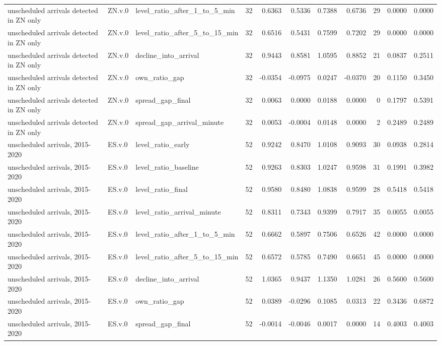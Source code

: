 \begin{tabular}{lllrrrrrrrr}
unscheduled arrivals detected in ZN only & ZN.v.0 & level_ratio_after_1_to_5_min & 32 & 0.6363 & 0.5336 & 0.7388 & 0.6736 & 29 & 0.0000 & 0.0000 \\
unscheduled arrivals detected in ZN only & ZN.v.0 & level_ratio_after_5_to_15_min & 32 & 0.6516 & 0.5431 & 0.7599 & 0.7202 & 29 & 0.0000 & 0.0000 \\
unscheduled arrivals detected in ZN only & ZN.v.0 & decline_into_arrival & 32 & 0.9443 & 0.8581 & 1.0595 & 0.8852 & 21 & 0.0837 & 0.2511 \\
unscheduled arrivals detected in ZN only & ZN.v.0 & own_ratio_gap & 32 & -0.0354 & -0.0975 & 0.0247 & -0.0370 & 20 & 0.1150 & 0.3450 \\
unscheduled arrivals detected in ZN only & ZN.v.0 & spread_gap_final & 32 & 0.0063 & 0.0000 & 0.0188 & 0.0000 & 0 & 0.1797 & 0.5391 \\
unscheduled arrivals detected in ZN only & ZN.v.0 & spread_gap_arrival_minute & 32 & 0.0053 & -0.0004 & 0.0148 & 0.0000 & 2 & 0.2489 & 0.2489 \\
unscheduled arrivals, 2015-2020 & ES.v.0 & level_ratio_early & 52 & 0.9242 & 0.8470 & 1.0108 & 0.9093 & 30 & 0.0938 & 0.2814 \\
unscheduled arrivals, 2015-2020 & ES.v.0 & level_ratio_baseline & 52 & 0.9263 & 0.8303 & 1.0247 & 0.9598 & 31 & 0.1991 & 0.3982 \\
unscheduled arrivals, 2015-2020 & ES.v.0 & level_ratio_final & 52 & 0.9580 & 0.8480 & 1.0838 & 0.9599 & 28 & 0.5418 & 0.5418 \\
unscheduled arrivals, 2015-2020 & ES.v.0 & level_ratio_arrival_minute & 52 & 0.8311 & 0.7343 & 0.9399 & 0.7917 & 35 & 0.0055 & 0.0055 \\
unscheduled arrivals, 2015-2020 & ES.v.0 & level_ratio_after_1_to_5_min & 52 & 0.6662 & 0.5897 & 0.7506 & 0.6526 & 42 & 0.0000 & 0.0000 \\
unscheduled arrivals, 2015-2020 & ES.v.0 & level_ratio_after_5_to_15_min & 52 & 0.6572 & 0.5785 & 0.7490 & 0.6651 & 45 & 0.0000 & 0.0000 \\
unscheduled arrivals, 2015-2020 & ES.v.0 & decline_into_arrival & 52 & 1.0365 & 0.9437 & 1.1350 & 1.0281 & 26 & 0.5600 & 0.5600 \\
unscheduled arrivals, 2015-2020 & ES.v.0 & own_ratio_gap & 52 & 0.0389 & -0.0296 & 0.1085 & 0.0313 & 22 & 0.3436 & 0.6872 \\
unscheduled arrivals, 2015-2020 & ES.v.0 & spread_gap_final & 52 & -0.0014 & -0.0046 & 0.0017 & 0.0000 & 14 & 0.4003 & 0.4003 \\

\end{tabular}
